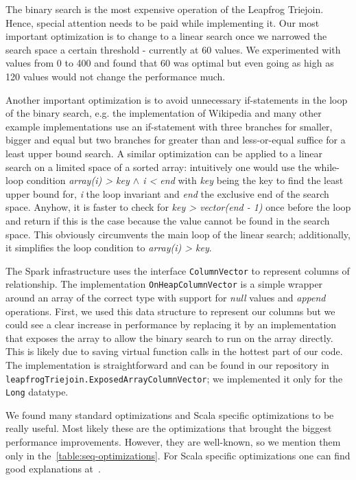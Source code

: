 The binary search is the most expensive operation of the Leapfrog Triejoin.
Hence, special attention needs to be paid while implementing it.
Our most important optimization is to change to a linear search once we narrowed the search space a certain threshold - currently at 60 values.
We experimented with values from 0 to 400 and found that 60 was optimal but even going as high as 120 values would not change the performance much.

Another important optimization is to avoid unnecessary if-statements in the loop of the binary search, e.g. the implementation of Wikipedia and many other
example implementations use an if-statement with three branches for smaller, bigger and equal but two branches for greater than and less-or-equal suffice for a least upper bound search.
A similar optimization can be applied to a linear search on a limited space of a sorted array: intuitively one would use the while-loop condition \textit{array(i) > key $\wedge$ i < end} with
\textit{key} being the key to find the least upper bound for, \textit{i} the loop invariant and \textit{end} the exclusive end of the search space.
Anyhow, it is faster to check for \textit{key > vector(end - 1)} once before the loop and return if this is the case because the value cannot be found in the search space.
This obviously circumvents the main loop of the linear search;
additionally, it simplifies the loop condition to \textit{array(i) > key}.

The Spark infrastructure uses the interface \texttt{ColumnVector} to represent columns of relationship.
The implementation \texttt{OnHeapColumnVector} is a simple wrapper around an array of the correct type with support for \textit{null} values and \textit{append} operations.
First, we used this data structure to represent our columns but we could see a clear increase in performance by replacing it by an implementation that exposes the array
to allow the binary search to run on the array directly.
This is likely due to saving virtual function calls in the hottest part of our code.
The implementation is straightforward and can be found in our repository in \texttt{leapfrogTriejoin.ExposedArrayColumnVector}; we implemented it only for the \texttt{Long} datatype.

We found many standard optimizations and Scala specific optimizations to be really useful.
Most likely these are the optimizations that brought the biggest performance improvements.
However, they are well-known, so we mention them only in the~\cref{table:seq-optimizations}.
For Scala specific optimizations one can find good explanations at~\cite{databricks-scala-guide}.

